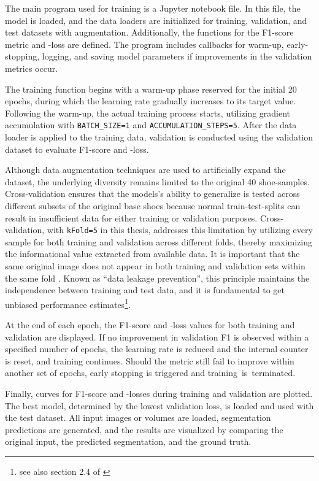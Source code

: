 The main program used for training is a Jupyter notebook file. In this file, the model is loaded, and the data loaders are initialized for training, validation, and test datasets with augmentation. Additionally, the functions for the F1-score metric and -loss are defined. The program includes callbacks for warm-up, early-stopping, logging, and saving model parameters if improvements in the validation metrics occur.

\medskip

The training function begins with a warm-up phase reserved for the initial 20 epochs, during which the learning rate gradually increases to its target value. Following the warm-up, the actual training process starts, utilizing gradient accumulation with  {\tt BATCH\_SIZE=1} and {\tt ACCUMULATION\_STEPS=5}. After the data loader is applied to the training data, validation is conducted using the validation dataset to evaluate F1-score and -loss.

\medskip

Although data augmentation techniques are used to artificially expand the dataset, the underlying diversity remains limited to the original 40 shoe-samples. Cross-validation ensures that the models's ability to generalize is tested across different subsets of the original base shoes because normal train-test-splits can result in insufficient data for either training or validation purposes. Cross-validation, with {\tt kFold=5} in this thesis, addresses this limitation by utilizing every sample for both training and validation across different folds, thereby maximizing the informational value extracted from available data. It is important that the same original image does not appear in both training and validation sets within the same fold \cite{Kohavi_1995, Arlot_Celisse_2010}. Known as \enquote{data leakage prevention}, this principle maintains the independence between training and test data, and it is fundamental to get unbiased performance estimates\footnote{see also section 2.4 of \cite{Kapoor_Narayanan_2023}}. 

\medskip

At the end of each epoch, the F1-score and -loss values for both training and validation are displayed. If no improvement in validation F1 is observed within a specified number of epochs, the learning rate is reduced and the internal counter is reset, and training continues. Should the metric still fail to improve within another set of epochs, early stopping is triggered and training is terminated.

\medskip

Finally, curves for F1-score and -losses during training and validation are plotted. The best model, determined by the lowest validation loss, is loaded and used with the test dataset. All input images or volumes are loaded, segmentation predictions are generated, and the results are visualized by comparing the original input, the predicted segmentation, and the ground truth.
